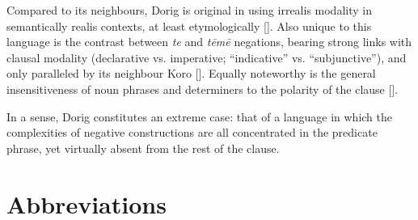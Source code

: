 \documentclass[output=paper,colorlinks,citecolor=brown,draft]{langscibook}
\begin{document}
Compared to its neighbours, Dorig is original in using irrealis modality in semantically \mbox{realis} contexts, at least etymologically []. Also unique to this language is the contrast between \textit{te} and \textit{tēmē} negations, bearing strong links with clausal modality (declarative vs. imperative; “indicative” vs. “subjunctive”), and only paralleled by its neighbour Koro []. Equally noteworthy is the general insensitiveness of noun phrases and determiners to the polarity of the clause [].

In a sense, Dorig constitutes an extreme case: that of a language in which the complexities of negative constructions are all concentrated in the predicate phrase, yet virtually absent from the rest of the clause.



\section*{Abbreviations}
\end{document}
